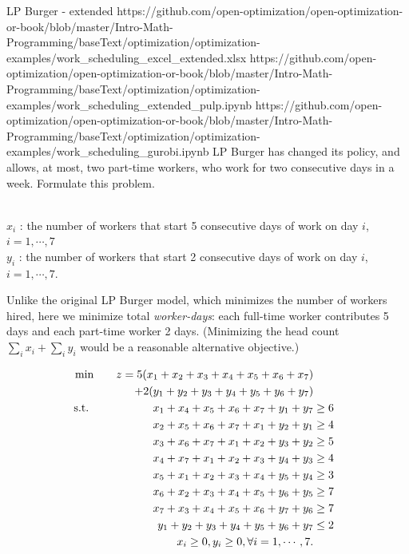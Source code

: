 \newpage
\begin{examplewithallcode}{LP Burger - extended}
{https://github.com/open-optimization/open-optimization-or-book/blob/master/Intro-Math-Programming/baseText/optimization/optimization-examples/work_scheduling_excel_extended.xlsx}
{https://github.com/open-optimization/open-optimization-or-book/blob/master/Intro-Math-Programming/baseText/optimization/optimization-examples/work_scheduling_extended_pulp.ipynb}
{https://github.com/open-optimization/open-optimization-or-book/blob/master/Intro-Math-Programming/baseText/optimization/optimization-examples/work_scheduling_gurobi.ipynb}
LP Burger has changed its policy, and allows, at most, two part-time workers, who work for two consecutive days in a week.  Formulate this problem.
\end{examplewithallcode}
\begin{solution}
 \\
$x_i$ : the number of workers that start 5 consecutive days of work on day $i$, $ i = 1,\cdots,7$ \\
$y_i$ : the number of workers that start 2 consecutive days of work on day $i$, $ i = 1,\cdots,7$.

Unlike the original LP Burger model, which minimizes the number of workers hired, here we minimize total \emph{worker-days}: each full-time worker contributes 5 days and each part-time worker 2 days. (Minimizing the head count $\sum_i x_i + \sum_i y_i$ would be a reasonable alternative objective.)

\smallskip {}
\begin{align*}
\min \quad && z = 5(x_1 + x_2 + x_3 + x_4 + x_5 + x_6 + x_7) \\
&& + 2(y_1 + y_2 + y_3 + y_4 + y_5 + y_6 + y_7) \nonumber \\
\mbox{ s.t. } \quad && x_1 + x_4 + x_5 + x_6 + x_7 + y_1 + y_7 &\ge 6 \\
&& x_2 + x_5 + x_6 + x_7 + x_1 + y_2 + y_1 &\ge 4 \\
&&           x_3 + x_6 + x_7 + x_1 + x_2 + y_3 + y_2 &\ge 5 \\
&&           x_4 + x_7 + x_1 + x_2 + x_3 + y_4 + y_3 &\ge 4 \\
&&           x_5 + x_1 + x_2 + x_3 + x_4 + y_5 + y_4 &\ge 3 \\
&&           x_6 + x_2 + x_3 + x_4 + x_5 + y_6 + y_5 &\ge 7 \\
&&           x_7 + x_3 + x_4 + x_5 + x_6 + y_7 + y_6 &\ge 7 \\
&&           y_1 + y_2 + y_3 + y_4 + y_5 + y_6 + y_7 &\le 2 \\
&&           x_i \ge 0, y_i \ge 0, \forall i = 1,\cdots,7.
\end{align*}
\end{solution}

